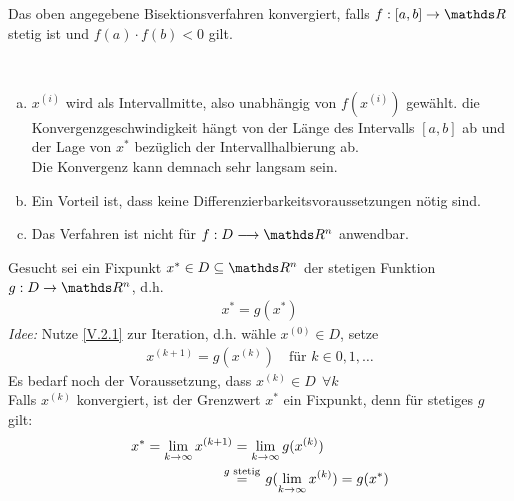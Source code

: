 \begin{Kore}
  Das oben angegebene Bisektionsverfahren konvergiert, falls
  $f:[a,b]\rightarrow \R $ stetig ist und 
  $f(a)\cdot f(b) <0$ gilt.
\end{Kore}

\begin{Beme}~
  \begin{enumerate}[a)]
  \item $x^{(i)} $ wird als Intervallmitte, also unabhängig von $f(x^{(i)})$
    gewählt. die Konvergenzgeschwindigkeit hängt von der Länge des Intervalls $[a,b]$ ab
    und der Lage von $x^{*}$ bezüglich der Intervallhalbierung ab. \\
    Die Konvergenz kann demnach sehr langsam sein.
  \item Ein Vorteil ist, dass keine Differenzierbarkeitsvoraussetzungen nötig sind.
  \item Das Verfahren ist nicht für $f:D\longrightarrow \R^n$ anwendbar.
  \end{enumerate}
\end{Beme}


Gesucht sei ein Fixpunkt $x^{*}\in D\subseteq \R^n$ der stetigen Funktion
$g:D\rightarrow\R^n$, d.h.
\begin{gather}
  x^{*} = g(x^{*}) \label{V.2.1}
\end{gather}
\textit{Idee:}
Nutze \eqref{V.2.1} zur Iteration, d.h. wähle $x^{(0)}\in D$,
setze 
\begin{gather}
  x^{(k+1)} = g(x^{(k)})  \quad \text{für } k\in 0, 1, \dotsc
  \label{V.2.2}
\end{gather}
Es bedarf noch der Voraussetzung, dass $x^{(k)}\in D~~ \forall k$ \\
Falls $x^{(k)}$ konvergiert, ist der Grenzwert $x^{*}$ ein Fixpunkt,
denn für stetiges $g$ gilt:
\begin{align} \nonumber
  x^{*} = \lim_{k\rightarrow \infty}x^{(k+1)} &= \lim_{k\rightarrow \infty}g(x^{(k)}) \\
                                              & \overset{\mathclap{g \text{ stetig}} }{=}\quad g(\lim_{k\rightarrow \infty}x^{(k)}) = g(x^{*})
                                                \label{V.2.3}
\end{align}



